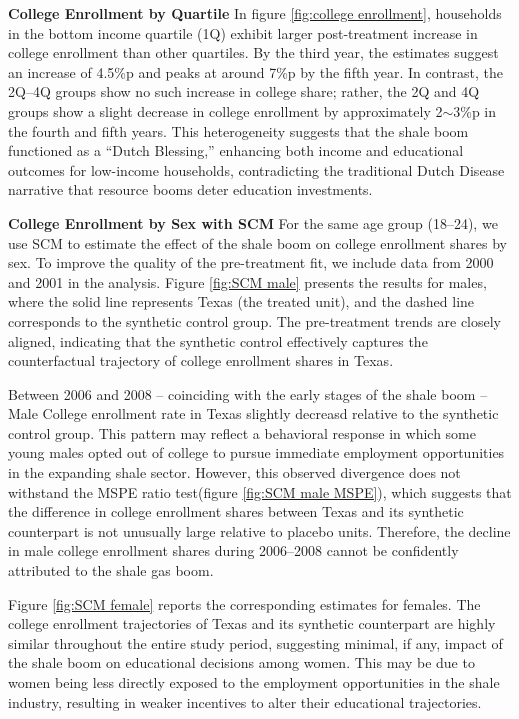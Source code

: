 \textbf{College Enrollment by Quartile} \hspace{0.1cm}
In figure \ref{fig:college enrollment}, households in the bottom income quartile (1Q) exhibit larger post-treatment increase in college enrollment than other quartiles. 
By the third year, the estimates suggest an increase of 4.5\%p and peaks at around 7\%p by the fifth year.
In contrast, the 2Q–4Q groups show no such increase in college share; rather, the 2Q and 4Q groups show a slight decrease in college enrollment by approximately 2$\sim$3\%p in the fourth and fifth years.
This heterogeneity suggests that the shale boom functioned as a “Dutch Blessing,” enhancing both income and educational outcomes for low-income households, contradicting the traditional Dutch Disease narrative that resource booms deter education investments.


\textbf{College Enrollment by Sex with SCM} \hspace{0.1cm}
For the same age group (18–24), we use SCM to estimate the effect of the shale boom on college enrollment shares by sex.
To improve the quality of the pre-treatment fit, we include data from 2000 and 2001 in the analysis.
Figure \ref{fig:SCM male} presents the results for males, where the solid line represents Texas (the treated unit), and the dashed line corresponds to the synthetic control group. 
The pre-treatment trends are closely aligned, indicating that the synthetic control effectively captures the counterfactual trajectory of college enrollment shares in Texas.

Between 2006 and 2008 – coinciding with the early stages of the shale boom – 
Male College enrollment rate in Texas slightly decreasd relative to the synthetic control group.
This pattern may reflect a behavioral response in which some young males opted out of college to pursue immediate employment opportunities 
in the expanding shale sector.
However, this observed divergence does not withstand the MSPE ratio test(figure \ref{fig:SCM male MSPE}),
which suggests that the difference in college enrollment shares between Texas and its synthetic counterpart is not unusually large relative to placebo units.
Therefore, the decline in male college enrollment shares during 2006–2008 cannot be confidently attributed to the shale gas boom.

Figure \ref{fig:SCM female} reports the corresponding estimates for females. 
The college enrollment trajectories of Texas and its synthetic counterpart are highly similar throughout the entire study period, suggesting minimal, if any, impact of the shale boom on educational decisions among women. 
This may be due to women being less directly exposed to the employment opportunities in the shale industry, resulting in weaker incentives to alter their educational trajectories. 

